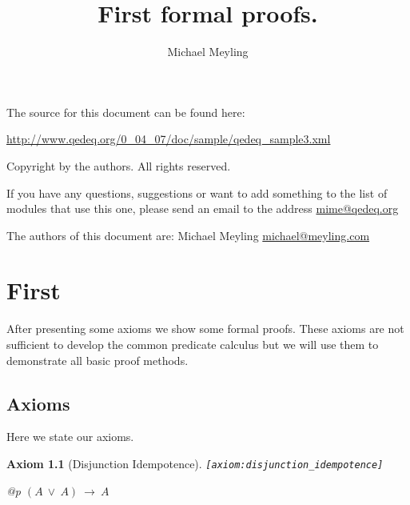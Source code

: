 \documentclass[a4paper,german,10pt,twoside]{book}
\title{First formal proofs.}
\author{
Michael Meyling
}
\newtheorem{ax}{Axiom}
\theoremstyle{definition}
\theoremstyle{remark}
\begin{document}
\maketitle

\setlength{\parskip}{5pt plus 2pt minus 1pt}
\mbox{}
\vfill

\par
The source for this document can be found here:
\par
\url{http://www.qedeq.org/0_04_07/doc/sample/qedeq_sample3.xml}

\par
Copyright by the authors. All rights reserved.
\par
If you have any questions, suggestions or want to add something to the list of modules that use this one, please send an email to the address \href{mailto:mime@qedeq.org}{mime@qedeq.org}

\par
The authors of this document are:
Michael Meyling \href{mailto:michael@meyling.com}{michael@meyling.com}



\setlength{\parskip}{0pt}
\tableofcontents

\setlength{\parskip}{5pt plus 2pt minus 1pt}

\chapter{First} \label{chapter1} \hypertarget{chapter1}{}

After presenting some axioms we show some formal proofs. These axioms are not sufficient to develop the common predicate calculus but we will use them to demonstrate all basic proof methods.

\section{Axioms} \label{chapter1_section1} \hypertarget{chapter1_section1}{}
Here we state our axioms.

\begin{ax}[Disjunction Idempotence]
\label{axiom:disjunction_idempotence} \hypertarget{axiom:disjunction_idempotence}{}
{\tt \tiny [\verb]axiom:disjunction_idempotence]]}
\mbox{}
\begin{longtable}{{@{\extracolsep{\fill}}p{\linewidth}}}
\centering $(A\ \lor\ A)\ \rightarrow\ A$
\end{longtable}

\end{ax}
\end{document}
